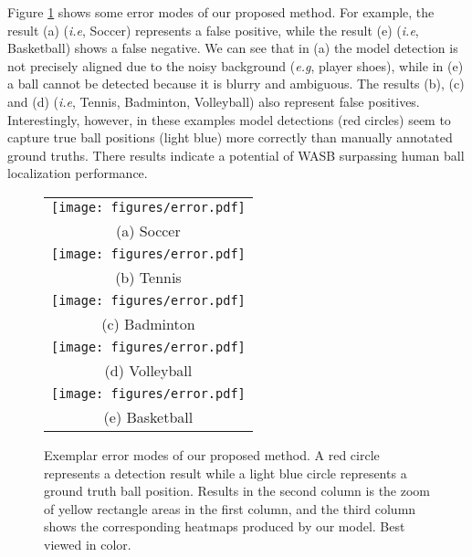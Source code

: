 \documentclass{bmvc2k}
\def\eg{\emph{e.g}\bmvaOneDot}
\def\ie{\emph{i.e}\bmvaOneDot}
\begin{document}
\par
Figure \ref{fig:error} shows some error modes of our proposed method.
For example, the result (a) (\ie, Soccer) represents a false positive, while the result (e) (\ie, Basketball) shows a false negative.
We can see that in (a) the model detection is not precisely aligned due to the noisy background (\eg, player shoes), while in (e) a ball cannot be detected because it is blurry and ambiguous.
The results (b), (c) and (d) (\ie, Tennis, Badminton, Volleyball) also represent false positives.
Interestingly, however, in these examples model detections (red circles) seem to capture true ball positions (light blue) more correctly than manually annotated ground truths.
There results indicate a potential of WASB surpassing human ball localization performance.
\begin{figure}[htbp]
\begin{tabular}{c}
\begin{minipage}[t]{1.0\hsize}
\centering
\texttt{[image: figures/error.pdf]}
\end{minipage}
\\
(a) Soccer
\\
\begin{minipage}[t]{1.0\hsize}
\centering
\texttt{[image: figures/error.pdf]}
\end{minipage}
\\
(b) Tennis
\\
\begin{minipage}[t]{1.0\hsize}
\centering
\texttt{[image: figures/error.pdf]}
\end{minipage}
\\
(c) Badminton
\\
\begin{minipage}[t]{1.0\hsize}
\centering
\texttt{[image: figures/error.pdf]}
\end{minipage}
\\
(d) Volleyball
\\
\begin{minipage}[t]{1.0\hsize}
\centering
\texttt{[image: figures/error.pdf]}
\end{minipage}
\\
(e) Basketball
\end{tabular}
\caption{Exemplar error modes of our proposed method. A red circle represents a detection result while a light blue circle represents a ground truth ball position. Results in the second column is the zoom of yellow rectangle areas in the first column, and the third column shows the corresponding heatmaps produced by our model. Best viewed in color.}
\label{fig:error}
\end{figure}

\newpage


\end{document}
